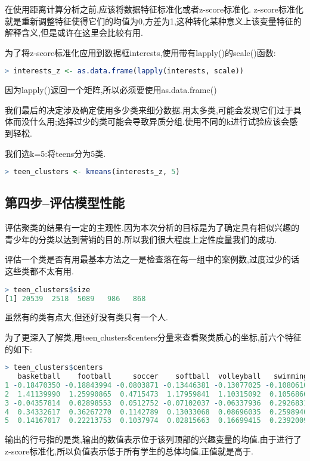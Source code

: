 \documentclass[11pt,a4paper,oneside]{book}
\begin{document}
在使用距离计算分析之前,应该将数据特征标准化或者z-score标准化. z-score标准化就是重新调整特征使得它们的均值为0,方差为1,这种转化某种意义上该变量特征的解释含义,但是或许在这里会比较有用.

为了将z-score标准化应用到数据框interests,使用带有lapply()的scale()函数:
\begin{lstlisting}[language=r]
> interests_z <- as.data.frame(lapply(interests, scale))
\end{lstlisting}
\begin{tcolorbox}[colback=pink!10!white,colframe=pink!100!black]
因为lapply()返回一个矩阵,所以必须要使用as.data.frame()
\end{tcolorbox}

我们最后的决定涉及确定使用多少类来细分数据.用太多类,可能会发现它们过于具体而没什么用;选择过少的类可能会导致异质分组.使用不同的k进行试验应该会感到轻松.

我们选k=5:将teens分为5类.
\begin{lstlisting}[language=r]
> teen_clusters <- kmeans(interests_z, 5)
\end{lstlisting}

\subsection{第四步--评估模型性能}
评估聚类的结果有一定的主观性.因为本次分析的目标是为了确定具有相似兴趣的青少年的分类以达到营销的目的.所以我们很大程度上定性度量我们的成功.

评估一个类是否有用最基本方法之一是检查落在每一组中的案例数,过度过少的话这些类都不太有用.
\begin{lstlisting}[language=r]
> teen_clusters$size
[1] 20539  2518  5089   986   868
\end{lstlisting}
虽然有的类有点大,但还好没有类只有一个人.

为了更深入了解类,用teen$\_$clusters$\$ $centers分量来查看聚类质心的坐标,前六个特征的如下:
\begin{lstlisting}[language=r]
> teen_clusters$centers
   basketball    football     soccer    softball  volleyball   swimming 
1 -0.18470350 -0.18843994 -0.0803871 -0.13446381 -0.13077025 -0.1080610  
2  1.41139990  1.25990865  0.4715473  1.17959841  1.10315092  0.1056866   
3 -0.04357814  0.02898553  0.0512752 -0.07102037 -0.06337936  0.2926831   
4  0.34332617  0.36267270  0.1142789  0.13033068  0.08696035  0.2598940   
5  0.14167017  0.22213753  0.1037974  0.02815663  0.16699415  0.2392009   
\end{lstlisting}
输出的行号指的是类,输出的数值表示位于该列顶部的兴趣变量的均值.由于进行了z-score标准化,所以负值表示低于所有学生的总体均值,正值就是高于.
\end{document}
